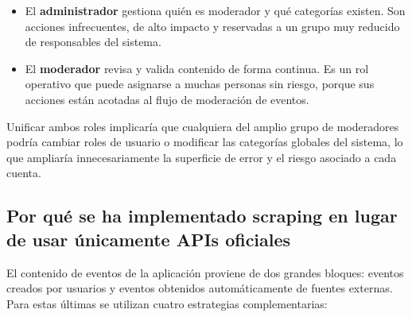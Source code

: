 \begin{itemize}
    \item El \textbf{administrador} gestiona quién es moderador y qué categorías existen. Son acciones infrecuentes, de alto impacto y reservadas a un grupo muy reducido de responsables del sistema.
    \item El \textbf{moderador} revisa y valida contenido de forma continua. Es un rol operativo que puede asignarse a muchas personas sin riesgo, porque sus acciones están acotadas al flujo de moderación de eventos.
\end{itemize}

Unificar ambos roles implicaría que cualquiera del amplio grupo de moderadores podría cambiar roles de usuario o modificar las categorías globales del sistema, lo que ampliaría innecesariamente la superficie de error y el riesgo asociado a cada cuenta.

\subsection{Por qué se ha implementado scraping en lugar de usar únicamente APIs oficiales}

El contenido de eventos de la aplicación proviene de dos grandes bloques: eventos creados por usuarios y eventos obtenidos automáticamente de fuentes externas. Para estas últimas se utilizan cuatro estrategias complementarias:

